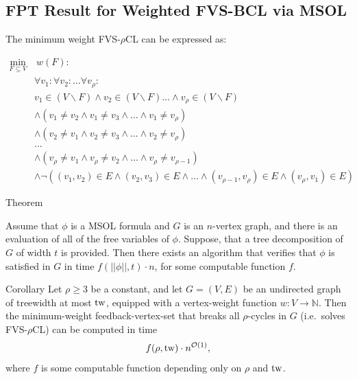 \subsection{FPT Result for Weighted FVS-BCL via MSOL}

 The minimum weight FVS-$\rho$CL can be expressed as:

\begin{equation}
    \label{courcelle:rho}
    \begin{aligned}
        \min_{F \subseteq V} & \ w(F) : \\
        & \forall v_1 : \forall v_2 : \dots \forall v_{\rho} : \\
        & v_1 \in (V \backslash F) \land v_2 \in (V \backslash F) \dots \land v_{\rho} \in (V \backslash F) \\
        & \land (v_1 \neq v_2 \land v_1 \neq v_3 \land \dots \land v_1 \neq v_{\rho}) \\ 
        & \land (v_2 \neq v_1 \land v_2 \neq v_3 \land \dots \land v_2 \neq v_{\rho}) \\
        & \dots \\
        & \land (v_{\rho} \neq v_1 \land v_{\rho} \neq v_2 \land \dots \land v_{\rho} \neq v_{\rho-1}) \\
        & \land \neg((v_1, v_2) \in E \land (v_2, v_3) \in E \land \dots \land (v_{\rho-1},v_{\rho}) \in E \land (v_{\rho}, v_1) \in E)
    \end{aligned}
\end{equation}


\begin{mydefinition}{Theorem}
    \label{theorem:courcelle}

    Assume that $\phi$ is a MSOL formula and $G$ is an $n$-vertex graph, and there is an evaluation 
    of all of the free variables of $\phi$. Suppose, that a tree decomposition of $G$ of width $t$ 
    is provided. Then there exists an algorithm that verifies that $\phi$ is satisfied 
    in $G$ in time $f(||\phi||, t) \cdot n$, for some computable function $f$. 
    
\end{mydefinition}

\begin{mydefinition}{Corollary}
    \label{cor:msol-fvs-rho}
    Let $\rho\ge 3$ be a constant, and let $G=(V,E)$ be an undirected graph of treewidth at 
    most $\operatorname{tw}$, equipped with a vertex-weight function $w:V\to\mathbb{N}$.  Then the 
    minimum-weight feedback-vertex-set that breaks all $\rho$-cycles in $G$ 
    (i.e.\ solves FVS-$\rho$CL) can be computed in time
    \[
        f(\rho, \operatorname{tw}) \cdot n^{\mathcal{O}(1)},
    \]
    where $f$ is some computable function depending only on $\rho$ and $\operatorname{tw}$. 
\end{mydefinition}
  

